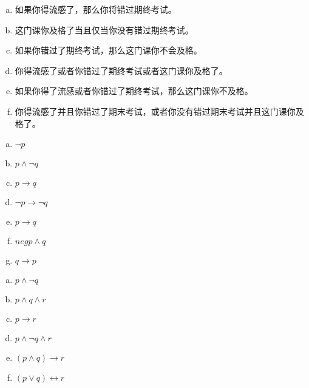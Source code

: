 {{        %
        \begin{practices}
            \begin{enumerate}[a)]
                \item 如果你得流感了，那么你将错过期终考试。
                \item 这门课你及格了当且仅当你没有错过期终考试。
                \item 如果你错过了期终考试，那么这门课你不会及格。
                \item 你得流感了或者你错过了期终考试或者这门课你及格了。
                \item 如果你得了流感或者你错过了期终考试，那么这门课你不及格。
                \item 你得流感了并且你错过了期末考试，或者你没有错过期末考试并且这门课你及格了。
            \end{enumerate}
        \end{practices}

        \begin{practices}
            \begin{enumerate}[a)]
                \item $\neg p$
                \item $p \wedge \neg q$
                \item $p \rightarrow q$
                \item $\neg p \rightarrow \neg q$
                \item $p \rightarrow q$
                \item $neg p \wedge q$
                \item $q \rightarrow p$
            \end{enumerate}
        \end{practices}

        \begin{practices}
            \begin{enumerate}[a)]
                \item $p \wedge \neg q$
                \item $p \wedge q \wedge r$
                \item $p \rightarrow r$
                \item $p \wedge \neg q \wedge r$
                \item $(p \wedge q) \rightarrow r$
                \item $(p \vee q) \leftrightarrow r$
            \end{enumerate}
        \end{practices}

}}
